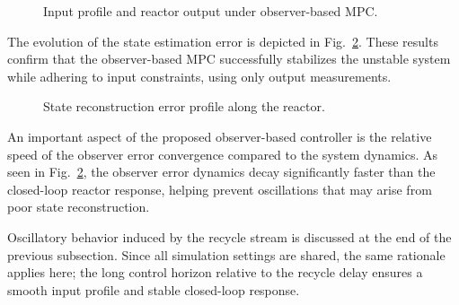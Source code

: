 \begin{figure}[!htbp]
    \centering
    
    \caption{Input profile and reactor output under observer-based MPC.}
    \label{fig:2_input_ECC}
\end{figure}

The evolution of the state estimation error is depicted in Fig.~\ref{fig:2_error_ECC}. These results confirm that the observer-based MPC successfully stabilizes the unstable system while adhering to input constraints, using only output measurements.

\begin{figure}[!htbp]
    \centering
    
    \caption{State reconstruction error profile along the reactor.}
    \label{fig:2_error_ECC}
\end{figure}

An important aspect of the proposed observer-based controller is the relative speed of the observer error convergence compared to the system dynamics. As seen in Fig.~\ref{fig:2_error_ECC}, the observer error dynamics decay significantly faster than the closed-loop reactor response, helping prevent oscillations that may arise from poor state reconstruction.

Oscillatory behavior induced by the recycle stream is discussed at the end of the previous subsection. Since all simulation settings are shared, the same rationale applies here; the long control horizon relative to the recycle delay ensures a smooth input profile and stable closed-loop response.
